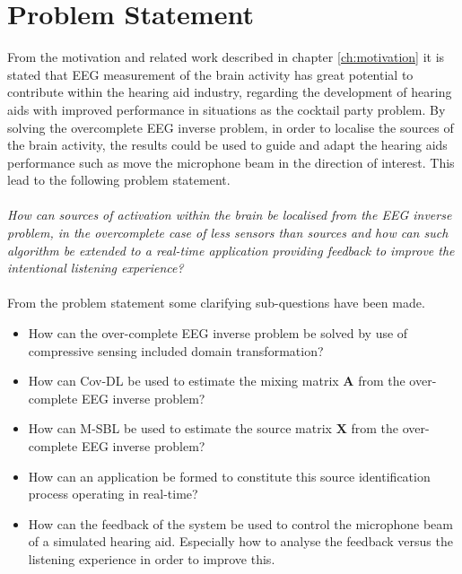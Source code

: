 \chapter{Problem Statement}
From the motivation and related work described in chapter \ref{ch:motivation} it is stated that EEG measurement of the brain activity has great potential to contribute within the hearing aid industry, regarding the development of hearing aids with improved performance in situations as the cocktail party problem. By solving the overcomplete EEG inverse problem, in order to localise the sources of the brain activity, the results could be used to guide and adapt the hearing aids performance such as move the microphone beam in the direction of interest. This lead to the following problem statement.
\\ \\
\textit{How can sources of activation within the brain be localised from the EEG inverse problem, in the overcomplete case of less sensors than sources and how can such algorithm be extended to a real-time application providing feedback to improve the intentional listening experience?}
\\ \\
From the problem statement some clarifying sub-questions have been made.
\begin{itemize}
\item How can the over-complete EEG inverse problem be solved by use of compressive sensing included domain transformation?
\item How can Cov-DL be used to estimate the mixing matrix $\mathbf{A}$ from the over-complete EEG inverse problem?
\item How can M-SBL be used to estimate the source matrix $\mathbf{X}$ from the over-complete EEG inverse problem?
\item How can an application be formed to constitute this source identification process operating in real-time?
\item How can the feedback of the system be used to control the microphone beam of a simulated hearing aid. Especially how to analyse the feedback versus the listening experience in order to improve this.   
\end{itemize}

 